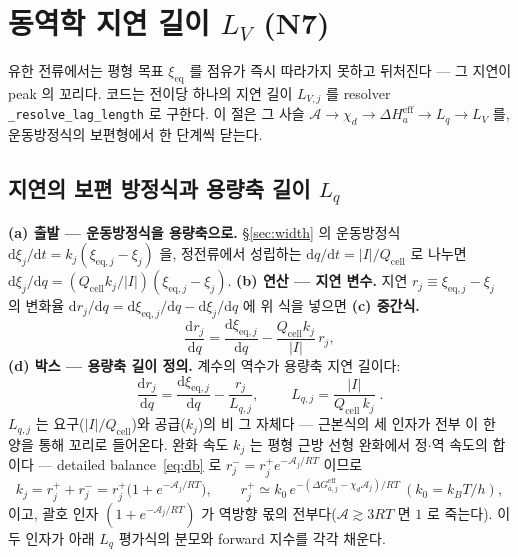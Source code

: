 \documentclass[11pt,a4paper]{article}
\newcommand{\dd}{\mathrm{d}}
\newcommand{\eff}{\mathrm{eff}}
\newcommand{\eq}{\mathrm{eq}}
\newcommand{\cell}{\mathrm{cell}}
\newcommand{\code}[1]{\texttt{#1}}
\begin{document}
\section{동역학 지연 길이 $L_V$ (N7)}\label{sec:lag}
유한 전류에서는 평형 목표 $\xi_\eq$ 를 점유가 즉시 따라가지 못하고 뒤처진다 — 그 지연이 peak 의 꼬리다. 코드는 전이당
하나의 지연 길이 $L_{V,j}$ 를 resolver \code{\_resolve\_lag\_length} 로 구한다. 이 절은 그 사슬
$\mathcal A\to\chi_d\to\Delta H_a^\eff\to L_q\to L_V$ 를, 운동방정식의 보편형에서 한 단계씩 닫는다.

\subsection{지연의 보편 방정식과 용량축 길이 $L_q$}
\textbf{(a) 출발 — 운동방정식을 용량축으로.} \S\ref{sec:width} 의 운동방정식 $\dd\xi_j/\dd t=k_j(\xi_{\eq,j}-\xi_j)$
을, 정전류에서 성립하는 $\dd q/\dd t=|I|/Q_\cell$ 로 나누면 $\dd\xi_j/\dd q=(Q_\cell k_j/|I|)(\xi_{\eq,j}-\xi_j)$.
\textbf{(b) 연산 — 지연 변수.} 지연 $r_j\equiv\xi_{\eq,j}-\xi_j$ 의 변화율 $\dd r_j/\dd q=\dd\xi_{\eq,j}/\dd q-\dd\xi_j/\dd q$
에 위 식을 넣으면 \textbf{(c) 중간식.}
\begin{equation}
\frac{\dd r_j}{\dd q}=\frac{\dd\xi_{\eq,j}}{\dd q}-\frac{Q_\cell k_j}{|I|}\,r_j,
\label{eq:Lqmid}
\end{equation}
\textbf{(d) 박스 — 용량축 길이 정의.} 계수의 역수가 용량축 지연 길이다:
\begin{equation}
\frac{\dd r_j}{\dd q}=\frac{\dd\xi_{\eq,j}}{\dd q}-\frac{r_j}{L_{q,j}},
\qquad \boxed{\;L_{q,j}=\frac{|I|}{Q_\cell\,k_j}\;.}
\label{eq:Lq}
\end{equation}
$L_{q,j}$ 는 요구($|I|/Q_\cell$)와 공급($k_j$)의 비 그 자체다 — 근본식의 세 인자가 전부 이 한 양을 통해 꼬리로
들어온다. 완화 속도 $k_j$ 는 평형 근방 선형 완화에서 정$\cdot$역 속도의 합이다 — detailed balance~\eqref{eq:db} 로
$r_j^-=r_j^+e^{-\mathcal A_j/RT}$ 이므로
\begin{equation}
k_j=r_j^++r_j^-=r_j^+\big(1+e^{-\mathcal A_j/RT}\big),
\qquad r_j^+\simeq k_0\,e^{-(\Delta G_{a,j}^\eff-\chi_d\mathcal A_j)/RT}\ (k_0=k_BT/h),
\label{eq:kuniv}
\end{equation}
이고, 괄호 인자 $(1+e^{-\mathcal A_j/RT})$ 가 역방향 몫의 전부다($\mathcal A\gtrsim3RT$ 면 $1$ 로 죽는다). 이 두 인자가
아래 $L_q$ 평가식의 분모와 forward 지수를 각각 채운다.
\end{document}
